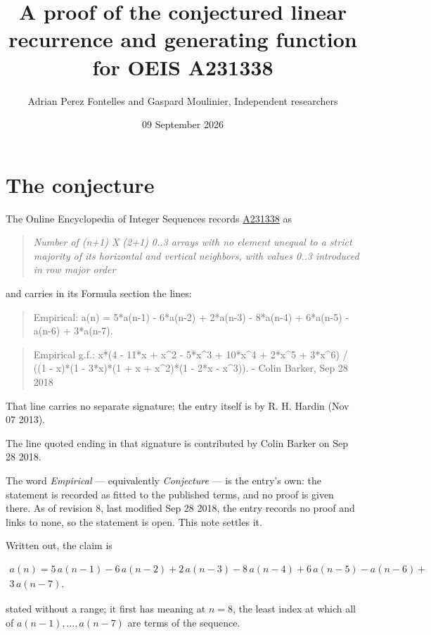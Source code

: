 \documentclass[11pt]{article}
\title{A proof of the conjectured linear recurrence and generating function for OEIS A231338}
\author{Adrian Perez Fontelles and Gaspard Moulinier, Independent researchers}
\date{09 September 2026}
\theoremstyle{definition}
\begin{document}
\maketitle
\section{The conjecture}

The Online Encyclopedia of Integer Sequences records \href{https://oeis.org/A231338}{A231338} as

\begin{quote}\itshape Number of (n+1) X (2+1) 0..3 arrays with no element unequal to a strict majority of its horizontal and vertical neighbors, with values 0..3 introduced in row major order\end{quote}

and carries in its Formula section the lines:

\begin{quote}\ttfamily Empirical: a(n) = 5*a(n-1) - 6*a(n-2) + 2*a(n-3) - 8*a(n-4) + 6*a(n-5) - a(n-6) + 3*a(n-7).\end{quote}

\begin{quote}\ttfamily Empirical g.f.: x*(4 - 11*x + x\textasciicircum{}2 - 5*x\textasciicircum{}3 + 10*x\textasciicircum{}4 + 2*x\textasciicircum{}5 + 3*x\textasciicircum{}6) / ((1 - x)*(1 - 3*x)*(1 + x + x\textasciicircum{}2)*(1 - 2*x - x\textasciicircum{}3)). - Colin Barker, Sep 28 2018\end{quote}

That line carries no separate signature; the entry itself is by R. H. Hardin (Nov 07 2013).

The line quoted ending in that signature is contributed by Colin Barker on Sep 28 2018.

The word {\itshape Empirical} --- equivalently {\itshape Conjecture} --- is the entry's own: the statement is recorded as fitted to the published terms, and no proof is given there. As of revision 8, last modified Sep 28 2018, the entry records no proof and links to none, so the statement is open. This note settles it.

Written out, the claim is

\begin{multline*} a(n) = 5\,a(n-1) - 6\,a(n-2) + 2\,a(n-3) - 8\,a(n-4) + 6\,a(n-5) - a(n-6) + \\ 3\,a(n-7). \end{multline*}

stated without a range; it first has meaning at $n = 8$, the least index at which all of $a(n-1),\dots,a(n-7)$ are terms of the sequence.
\end{document}

